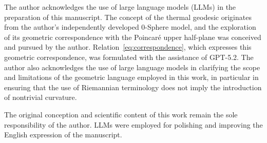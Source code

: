 \documentclass[%
 reprint,
 amsmath,amssymb,
 aps,
 prb,
]{revtex4-2}
\numberwithin{equation}{section}
\begin{document}
The author acknowledges the use of large language models (LLMs) in the preparation of this manuscript. The concept of the thermal geodesic originates from the author's independently developed 0-Sphere model, and the exploration of its geometric correspondence with the Poincaré upper half-plane was conceived and pursued by the author. Relation~\eqref{eq:correspondence}, which expresses this geometric correspondence, was formulated with the assistance of GPT-5.2. The author also acknowledges the use of large language models in clarifying the scope and limitations of the geometric language employed in this work, in particular in ensuring that the use of Riemannian terminology does not imply the introduction of nontrivial curvature.

The original conception and scientific content of this work remain the sole responsibility of the author. LLMs were employed for polishing and improving the English expression of the manuscript.

\clearpage
\end{document}
